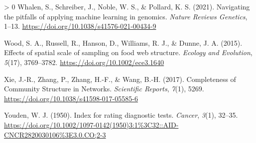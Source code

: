 \documentclass[11pt]{article}
\newlength{\cslhangindent}
\newenvironment{CSLReferences}[3] %
 {%
  \setlength{\parindent}{0pt}
  \ifodd #1 \everypar{\setlength{\hangindent}{\cslhangindent}}\ignorespaces\fi
  \ifnum #2 > 0
  \setlength{\parskip}{#2\baselineskip}
  \fi
 }%
 {}
\begin{document}
\begin{CSLReferences}{1}{0}
\leavevmode\hypertarget{ref-Whalen2021NavPit}{}%
Whalen, S., Schreiber, J., Noble, W. S., \& Pollard, K. S. (2021).
Navigating the pitfalls of applying machine learning in genomics.
\emph{Nature Reviews Genetics}, 1--13.
\url{https://doi.org/10.1038/s41576-021-00434-9}

\leavevmode\hypertarget{ref-Wood2015EffSpa}{}%
Wood, S. A., Russell, R., Hanson, D., Williams, R. J., \& Dunne, J. A.
(2015). Effects of spatial scale of sampling on food web structure.
\emph{Ecology and Evolution}, \emph{5}(17), 3769--3782.
\url{https://doi.org/10.1002/ece3.1640}

\leavevmode\hypertarget{ref-Xie2017ComCom}{}%
Xie, J.-R., Zhang, P., Zhang, H.-F., \& Wang, B.-H. (2017). Completeness
of Community Structure in Networks. \emph{Scientific Reports},
\emph{7}(1), 5269. \url{https://doi.org/10.1038/s41598-017-05585-6}

\leavevmode\hypertarget{ref-Youden1950IndRat}{}%
Youden, W. J. (1950). Index for rating diagnostic tests. \emph{Cancer},
\emph{3}(1), 32--35.
\url{https://doi.org/10.1002/1097-0142(1950)3:1\%3C32::AID-CNCR2820030106\%3E3.0.CO;2-3}

\end{CSLReferences}
\end{document}
